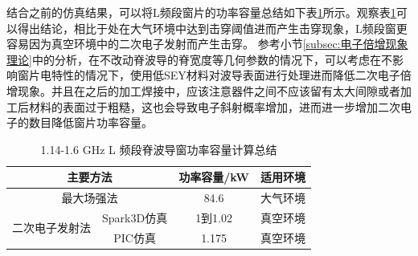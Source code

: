\documentclass[master]{thesis-uestc}
\begin{document}
结合之前的仿真结果，可以将L频段窗片的功率容量总结如下表\ref{tab:L频段脊波导窗功率容量}所示。观察表\ref{tab:L频段脊波导窗功率容量}可以得出结论，相比于处在大气环境中达到击穿阈值进而产生击穿现象，L频段窗更容易因为真空环境中的二次电子发射而产生击穿。
参考小节\ref{subsec:电子倍增现象理论}中的分析，在不改动脊波导的脊宽度等几何参数的情况下，可以考虑在不影响窗片电特性的情况下，使用低SEY材料对波导表面进行处理进而降低二次电子倍增现象。并且在之后的加工焊接中，应该注意器件之间不应该留有太大间隙或者加工后材料的表面过于粗糙，这也会导致电子斜射概率增加，进而进一步增加二次电子的数目降低窗片功率容量。
\begin{table}[!htb]
    \centering
    \caption{1.14-1.6 GHz L 频段脊波导窗功率容量计算总结}
    \label{tab:L频段脊波导窗功率容量}
    \begin{tabular}{@{}cccc@{}}
    \toprule[1.5pt]
    \multicolumn{2}{c}{主要方法}             & 功率容量/kW & 适用环境 \\ \midrule
    \multicolumn{2}{c}{最大场强法}            & 84.6     & 大气环境 \\
    \multirow{2}{*}{二次电子发射法} & Spark3D仿真 & 1到1.02    & 真空环境 \\
                             & PIC仿真     & 1.175    & 真空环境 \\ \bottomrule[1.5pt]
    \end{tabular}
\end{table}
\end{document}
